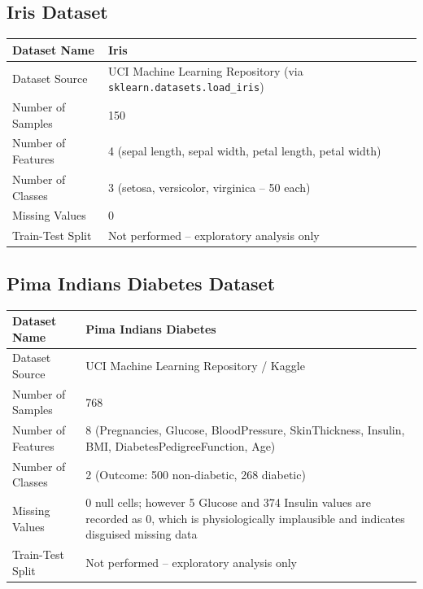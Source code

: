 \documentclass[12pt,a4paper]{article}
\begin{document}
\subsection*{Iris Dataset}
\begin{longtable}{|p{6cm}|p{8cm}|}
\hline
Dataset Name & Iris \\ \hline
Dataset Source & UCI Machine Learning Repository (via \texttt{sklearn.datasets.load\_iris}) \\ \hline
Number of Samples & 150 \\ \hline
Number of Features & 4 (sepal length, sepal width, petal length, petal width) \\ \hline
Number of Classes & 3 (setosa, versicolor, virginica -- 50 each) \\ \hline
Missing Values & 0 \\ \hline
Train-Test Split & Not performed -- exploratory analysis only \\ \hline
\end{longtable}

\subsection*{Pima Indians Diabetes Dataset}
\begin{longtable}{|p{6cm}|p{8cm}|}
\hline
Dataset Name & Pima Indians Diabetes \\ \hline
Dataset Source & UCI Machine Learning Repository / Kaggle \\ \hline
Number of Samples & 768 \\ \hline
Number of Features & 8 (Pregnancies, Glucose, BloodPressure, SkinThickness, Insulin, BMI, DiabetesPedigreeFunction, Age) \\ \hline
Number of Classes & 2 (Outcome: 500 non-diabetic, 268 diabetic) \\ \hline
Missing Values & 0 null cells; however 5 Glucose and 374 Insulin values are recorded as 0, which is physiologically implausible and indicates disguised missing data \\ \hline
Train-Test Split & Not performed -- exploratory analysis only \\ \hline
\end{longtable}
\end{document}
